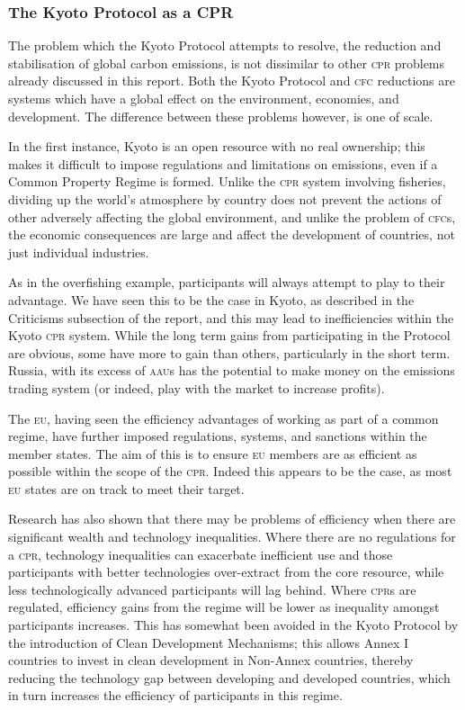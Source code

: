 \subsubsection{The Kyoto Protocol as a CPR}

The problem which the Kyoto Protocol attempts to resolve, the reduction and stabilisation of global carbon emissions, is not dissimilar to other \textsc{cpr} problems already discussed in this report. Both the Kyoto Protocol and \textsc{cfc} reductions are  systems which have a global effect on the environment, economies, and development. The difference between these problems however, is one of scale.

In the first instance, Kyoto is an open resource with no real ownership; this makes it difficult to impose regulations and limitations on emissions, even if a Common Property Regime is formed. Unlike the \textsc{cpr} system involving fisheries, dividing up the world’s atmosphere by country does not prevent the actions of other adversely affecting the global environment, and unlike the problem of \textsc{cfc}s, the economic consequences are large and affect the development of countries, not just individual industries.

As in the overfishing example, participants will always attempt to play to their advantage. We have seen this to be the case in Kyoto, as described in the Criticisms subsection of the report, and this may lead to inefficiencies within the Kyoto \textsc{cpr} system. While the long term gains from participating in the Protocol are obvious, some have more to gain than others, particularly in the short term. Russia, with its excess of \textsc{aau}s has the potential to make money on the emissions trading system (or indeed, play with the market to increase profits).

The \textsc{eu}, having seen the efficiency advantages of working as part of a common regime, have further imposed regulations, systems, and sanctions within the member states. The aim of this is to ensure \textsc{eu} members are as efficient as possible within the scope of the \textsc{cpr}. Indeed this appears to be the case, as most \textsc{eu} states are on track to meet their target.~\cite{EEA-Tracking-progress-20}

Research has also shown that there may be problems of efficiency when there are significant wealth and technology inequalities. Where there are no regulations for a \textsc{cpr}, technology inequalities can exacerbate inefficient use and those participants with better technologies over-extract from the core resource, while less technologically advanced participants will lag behind. Where \textsc{cpr}s are regulated, efficiency gains from  the regime will be lower as inequality amongst participants increases. This has somewhat been avoided in the Kyoto Protocol by the introduction of Clean Development Mechanisms; this allows Annex I countries to invest in clean development in Non-Annex countries, thereby reducing the technology gap between developing and developed countries, which in turn increases the efficiency of participants in this regime.~\cite{Wealth-inequality-regulated}\cite{Wealth-inequality-unregulated}

